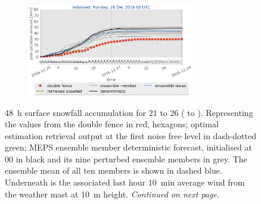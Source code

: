 \begin{figure}[H]
	\begin{subfigure}[t]{\textwidth}
		\centering
		\includegraphics[trim={1.2cm 0cm 1.1cm 21.4cm},clip,width=0.8\textwidth]{./fig_sfc_acc/acc_wind_20161226_00}
	\end{subfigure}
	\caption{\SI{48}{\hour} surface snowfall accumulation for \num{21} to \SI{26}{\dec} (\protect{} to \protect{}). Representing the values from the double fence in red, hexagons; optimal estimation retrieval output at the first noise free level
		in dash-dotted green; MEPS ensemble member deterministic forecast, initialised at \SI{00}{\UTC} in black and its nine perturbed ensemble members in grey. The ensemble mean of all ten members is shown in dashed blue. Underneath is the associated last hour \SI{10}{\minute} average wind from the weather mast at \SI{10}{\metre} height. \textit{Continued on next page.}}\label{fig:sfc_acc}
\end{figure}
